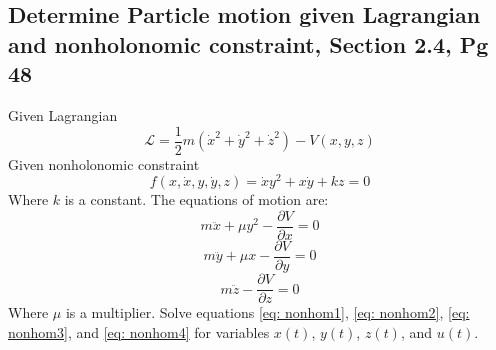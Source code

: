 \documentclass[12pt]{article}
\begin{document}
    \subsection{Determine Particle motion given Lagrangian and nonholonomic constraint, Section 2.4, Pg 48}
    Given Lagrangian 
    \begin{equation}
        \mathcal{L} = \frac{1}{2} m (\dot{x}^2 + \dot{y}^2 + \dot{z}^2) - V(x,y,z)
    \end{equation}
    Given nonholonomic constraint
    \begin{equation} \label{eq: nonhom1}
        f(x,\dot{x}, y, \dot{y}, z) = \dot{x} y^2 + x \dot{y} + k z = 0
    \end{equation}
    Where $k$ is a constant. The equations of motion are:
    \begin{equation} \label{eq: nonhom2}
        m \ddot{x} + \mu y^2 - \frac{\partial V}{\partial x} = 0
    \end{equation}
    \begin{equation} \label{eq: nonhom3}
        m \ddot{y} + \mu x - \frac{\partial V}{\partial y} = 0
    \end{equation}
    \begin{equation} \label{eq: nonhom4}
        m \ddot{z} - \frac{\partial V}{\partial z} = 0
    \end{equation}
    Where $\mu$ is a multiplier. Solve equations \ref{eq: nonhom1}, \ref{eq: nonhom2}, \ref{eq: nonhom3}, and \ref{eq: nonhom4} for variables $x(t)$, $y(t)$, $z(t)$, and $u(t)$.
\end{document}
